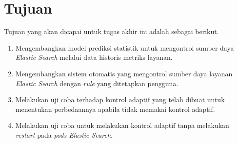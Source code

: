 \section{Tujuan}

Tujuan yang akan dicapai untuk tugas akhir ini adalah sebagai berikut.

\begin{enumerate}
    \item Mengembangkan model prediksi statistik untuk mengontrol sumber daya \textit{Elastic Search} melalui data historis metriks layanan.
    \item Mengembangkan sistem otomatis yang mengontrol sumber daya layanan \textit{Elastic Search} dengan \textit{rule} yang ditetapkan pengguna.
    \item Melakukan uji coba terhadap kontrol adaptif yang telah dibuat untuk menentukan perbedaannya apabila tidak memakai kontrol adaptif.
    \item Melakukan uji coba untuk melakukan kontrol adaptif tanpa melakukan \textit{restart} pada \textit{pods Elastic Search}.
\end{enumerate}